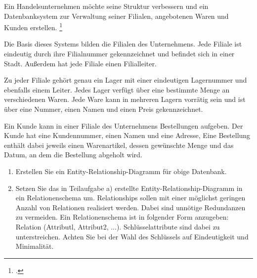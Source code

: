\documentclass{bschlangaul-aufgabe}
\begin{document}

Ein Handelsunternehmen möchte seine Struktur verbessern und ein
Datenbanksystem zur Verwaltung seiner Filialen, angebotenen Waren und
Kunden erstellen.
\footcite{examen:66116:2012:03}

Die Basis dieses Systems bilden die Filialen des Unternehmens. Jede
Filiale ist eindeutig durch ihre Filialnummer gekennzeichnet und
befindet sich in einer Stadt. Außerdem hat jede Filiale einen
Filialleiter.

Zu jeder Filiale gehört genau ein Lager mit einer eindeutigen
Lagernummer und ebenfalls einem Leiter. Jedes Lager verfügt über eine
bestimmte Menge an verschiedenen Waren. Jede Ware kann in mehreren
Lagern vorrätig sein und ist über eine Nummer, einen Namen und einen
Preis gekennzeichnet.

Ein Kunde kann in einer Filiale des Unternehmens Bestellungen aufgeben.
Der Kunde hat eine Kundennummer, einen Namen und eine Adresse, Eine
Bestellung enthält dabei jeweils einen Warenartikel, dessen gewünschte
Menge und das Datum, an dem die Bestellung abgeholt wird.

\begin{enumerate}


\item Erstellen Sie ein Entity-Relationship-Diagramm für obige Datenbank.


\item Setzen Sie das in Teilaufgabe a) erstellte
Entity-Relationship-Diagramm in ein Relationenschema um. Relationships
sollen mit einer möglichst geringen Anzahl von Relationen realisiert
werden. Dabei sind unnötige Redundanzen zu vermeiden. Ein
Relationenschema ist in folgender Form anzugeben: Relation (Attributl,
Attribut2, ...). Schlüsselattribute sind dabei zu unterstreichen. Achten
Sie bei der Wahl des Schlüssels auf Eindeutigkeit und Minimalität.

\end{enumerate}
\end{document}
